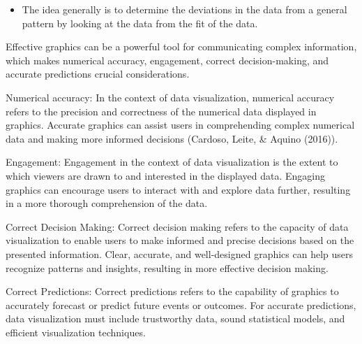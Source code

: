 \documentclass[print]{nuthesis}
\providecommand{\tightlist}{%
  \setlength{\itemsep}{0pt}\setlength{\parskip}{0pt}}
\begin{document}
\begin{itemize}
\tightlist
\item
  The idea generally is to determine the deviations in the data from a general pattern by looking at the data from the fit of the data.
\end{itemize}


Effective graphics can be a powerful tool for communicating complex information, which makes numerical accuracy, engagement, correct decision-making, and accurate predictions crucial considerations.

Numerical accuracy: In the context of data visualization, numerical accuracy refers to the precision and correctness of the numerical data displayed in graphics.
Accurate graphics can assist users in comprehending complex numerical data and making more informed decisions (Cardoso, Leite, \& Aquino (2016)).

Engagement: Engagement in the context of data visualization is the extent to which viewers are drawn to and interested in the displayed data.
Engaging graphics can encourage users to interact with and explore data further, resulting in a more thorough comprehension of the data.

Correct Decision Making: Correct decision making refers to the capacity of data visualization to enable users to make informed and precise decisions based on the presented information.
Clear, accurate, and well-designed graphics can help users recognize patterns and insights, resulting in more effective decision making.

Correct Predictions: Correct predictions refers to the capability of graphics to accurately forecast or predict future events or outcomes.
For accurate predictions, data visualization must include trustworthy data, sound statistical models, and efficient visualization techniques.
\end{document}
